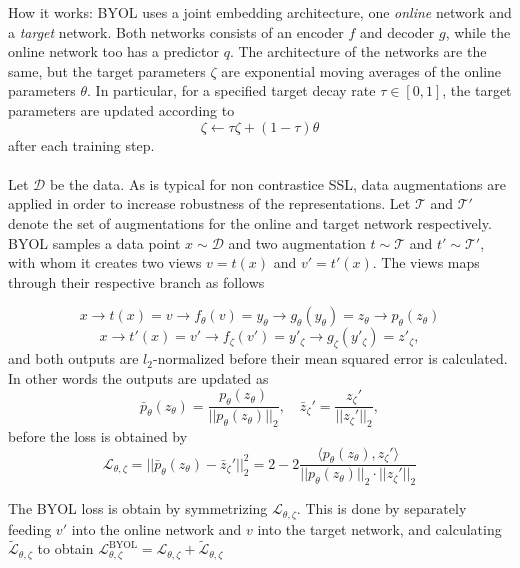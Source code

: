 \documentclass[../../thesis.tex]{subfiles}
\begin{document}
How it works:
BYOL uses a joint embedding architecture, one \textit{online} network and a \textit{target} network. Both networks consists of an encoder $f$ and decoder $g$, while the online network too has a predictor $q$. The architecture of the networks are the same, but the target parameters $\zeta$ are exponential moving averages of the online parameters $\theta$. In particular, for a specified target decay rate $\tau\in[0,1]$, the target parameters are updated according to 
\begin{equation}
    \zeta \leftarrow \tau \zeta + (1-\tau)\theta
\end{equation}
after each training step. \\\\

Let $\mathcal{D}$ be the data. As is typical for non contrastice SSL, data augmentations are applied in order to increase robustness of the representations. Let $\mathcal{T}$  and $\mathcal{T'}$ denote the set of augmentations for the online and target network respectively. BYOL samples a data point $x\sim \mathcal{D}$ and two augmentation $t\sim \mathcal{T}$ and $t'\sim \mathcal{T'}$, with whom it creates two views $v = t(x)$ and $v' = t'(x)$. The views maps through their respective branch as follows

\begin{equation}
    x \to t(x) = v \to f_\theta(v) = y_\theta \to g_\theta (y_\theta) = z_\theta \to p_\theta(z_\theta)
\end{equation}
\begin{equation}
    x \to t'(x) = v' \to f_\zeta(v') = y'_\zeta \to g_\zeta (y'_\zeta) = z'_\zeta,
\end{equation}
and both outputs are $l_2$-normalized before their mean squared error is calculated. In other words the outputs are updated as
\begin{equation}
    \bar{p}_\theta(z_\theta) = \frac{p_\theta(z_\theta)}{||p_\theta(z_\theta)||_2}, \quad \bar{z}_\zeta' = \frac{z_\zeta'}{||z_\zeta'||_2},
\end{equation}
before the loss is obtained by 
\begin{equation}
    \mathcal{L}_{\theta,\zeta} = ||\bar{p}_\theta(z_\theta) - \bar{z}_\zeta'||_2^2 = 2-2 \frac{\langle p_\theta(z_\theta), z_\zeta'\rangle}{||p_\theta(z_\theta)||_2\cdot||z_\zeta'||_2}
\end{equation}

The BYOL loss is obtain by symmetrizing $\mathcal{L}_{\theta,\zeta}$. This is done by separately feeding $v'$ into the online network and $v$ into the target network, and calculating $\mathcal{\tilde{L}}_{\theta,\zeta}$ to obtain $\mathcal{L}^{\text{BYOL}}_{\theta,\zeta} = \mathcal{L}_{\theta,\zeta} + \mathcal{\tilde{L}}_{\theta,\zeta}$
\end{document}
